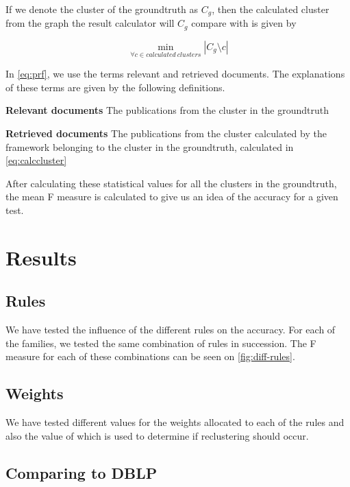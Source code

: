 If we denote the cluster of the groundtruth as $C_g$, then the calculated cluster from the graph the result calculator will $C_g$ compare with is given by 

\begin{equation}
	\label{eq:calccluster}
	\min_{\forall c \in calculated~clusters}{\left| C_g \setminus c \right|}
\end{equation}

In \autoref{eq:prf}, we use the terms relevant and retrieved documents. The explanations of these terms are given by the following definitions.

\begin{mydef}
	\textbf{Relevant documents} The publications from the cluster in the groundtruth
\end{mydef}

\begin{mydef}
	\textbf{Retrieved documents} The publications from the cluster calculated by the framework belonging to the cluster in the groundtruth, calculated in \autoref{eq:calccluster}
\end{mydef}

After calculating these statistical values for all the clusters in the groundtruth, the mean F measure is calculated to give us an idea of the accuracy for a given test.

\section{Results}

\subsection{Rules}

We have tested the influence of the different rules on the accuracy. For each of the families, we tested the same combination of rules in succession. The F measure for each of these combinations can be seen on \ref{fig:diff-rules}.


\subsection{Weights}

We have tested different values for the weights allocated to each of the rules and also the value of \alpha which is used to determine if reclustering should occur. 

\subsection{Comparing to DBLP}

